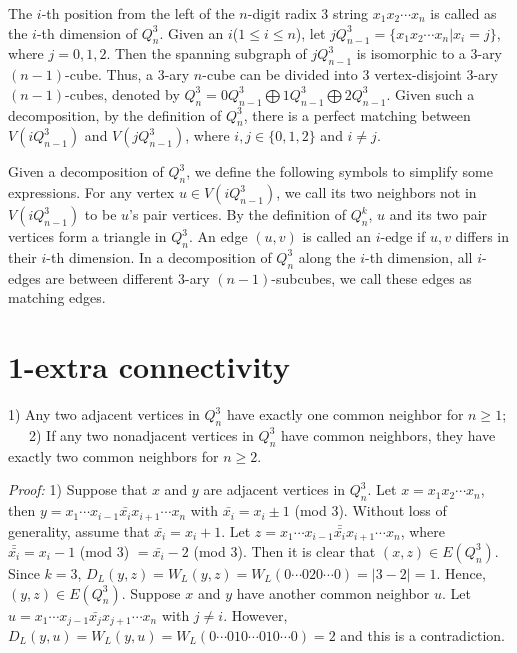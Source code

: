 \documentclass[preprint,number,12pt]{elsarticle}
\begin{document}
The $i$-th position from the left of the $n$-digit radix 3 string $x_{1}x_{2} \cdots x_{n}$ is called as the $i$-th dimension of $Q_n^3$.
Given an $i$($1\le i\le n$), let $jQ_{n-1}^{3}=\{x_1 x_2\cdots x_n | x_i=j\}$, where $j=0, 1, 2$. Then the spanning subgraph of $jQ_{n-1}^{3}$ is isomorphic to a $3$-ary $(n-1)$-cube. Thus, a $3$-ary $n$-cube can be divided into $3$ vertex-disjoint 3-ary $(n-1)$-cubes, denoted by $Q_n^3=0Q_{n-1}^{3}\bigoplus 1Q_{n-1}^{3}\bigoplus 2Q_{n-1}^{3}$.
Given such a decomposition, by the definition of $Q_n^3$, there is a perfect matching between
$V(iQ_{n-1}^3)$ and $V(jQ_{n-1}^3)$, where $i, j \in \{0, 1, 2\}$
and $i\not=j$.

Given a decomposition of $Q_n^3$, we define the following symbols to simplify some expressions.
For any vertex $u\in V(iQ_{n-1}^{3})$, we call its two neighbors not in  $V(iQ_{n-1}^{3})$ to be $u$'s pair vertices. By the definition of $Q_n^k$, $u$ and its two pair vertices form a triangle in $Q_n^3$.  An edge $(u, v)$ is called an $i$-edge if $u, v$ differs in their $i$-th dimension. In a decomposition of $Q_n^3$ along the $i$-th dimension, all $i$-edges are between different 3-ary $(n-1)$-subcubes, we call these edges as matching edges.

\section{1-extra connectivity}\label{S3:SSG}

\begin{lem}\label{l1}
1) Any two adjacent vertices in $Q_{n}^{3}$ have exactly one common neighbor for $n \geq 1$; \ \ \  2) If any two nonadjacent vertices in $Q_{n}^{3}$ have common neighbors, they have exactly two common neighbors for $n \geq 2$.
\end{lem}
\emph{Proof:}
1) Suppose that $x$ and $y$ are adjacent vertices in $Q_{n}^{3}$. Let $x = x_{1}x_{2} \cdots x_{n}$, then $y = x_{1} \cdots x_{i-1} \bar{x_{i}}x_{i+1} \cdots x_{n}$ with $\bar{x_{i}} = x_{i} \pm 1$ (mod 3). Without loss of generality, assume that $\bar{x_{i}} = x_{i}+1$. Let $z = x_{1} \cdots x_{i-1} \bar{\bar{x_{i}}}x_{i+1} \cdots x_{n}$, where $\bar{\bar{x_{i}}} = x_{i}-1$ (mod 3) $ =  \bar{x_{i}}-2$ (mod 3). Then it is clear that $(x, z) \in E(Q_{n}^{3})$. Since $k = 3$, $D_{L}(y, z) = W_{L}(y, z) = W_{L}(0 \cdots 020 \cdots 0) = |3-2| = 1$. Hence, $(y, z) \in E(Q_{n}^{3})$. Suppose $x$ and $y$ have another common neighbor $u$. Let $u = x_{1} \cdots x_{j-1} \bar{x_{j}}x_{j+1} \cdots x_{n}$ with $j \neq i$. However, $D_{L}(y, u) = W_{L}(y, u) = W_{L}(0 \cdots 010 \cdots 010 \cdots 0) = 2$ and this is a contradiction.
\end{document}
